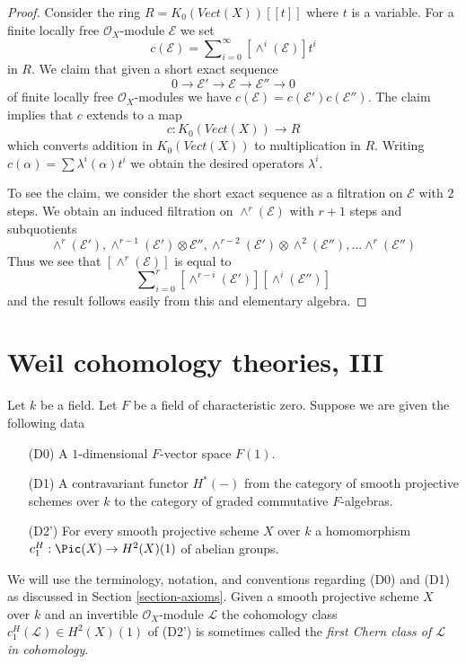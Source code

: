 \begin{proof}
Consider the ring $R = K_0(\textit{Vect}(X))[[t]]$ where $t$ is a
variable. For a finite locally free $\mathcal{O}_X$-module
$\mathcal{E}$ we set
$$
c(\mathcal{E}) = \sum\nolimits_{i = 0}^\infty [\wedge^i(\mathcal{E})] t^i
$$
in $R$. We claim that given a short exact sequence
$$
0 \to \mathcal{E}' \to \mathcal{E} \to \mathcal{E}'' \to 0
$$
of finite locally free $\mathcal{O}_X$-modules
we have $c(\mathcal{E}) = c(\mathcal{E}') c(\mathcal{E}'')$.
The claim implies that $c$ extends to a map
$$
c :  K_0(\textit{Vect}(X)) \longrightarrow R
$$
which converts addition in $K_0(\textit{Vect}(X))$ to multiplication in $R$.
Writing $c(\alpha) = \sum \lambda^i(\alpha) t^i$ we obtain the desired
operators $\lambda^i$.

\medskip\noindent
To see the claim, we consider the short exact sequence as a
filtration on $\mathcal{E}$ with $2$ steps. We obtain an induced
filtration on $\wedge^r(\mathcal{E})$ with $r + 1$ steps and
subquotients
$$
\wedge^r(\mathcal{E}'),
\wedge^{r - 1}(\mathcal{E}') \otimes \mathcal{E}'',
\wedge^{r - 2}(\mathcal{E}') \otimes \wedge^2(\mathcal{E}''), \ldots
\wedge^r(\mathcal{E}'')
$$
Thus we see that $[\wedge^r(\mathcal{E})]$ is equal to
$$
\sum\nolimits_{i = 0}^r
[\wedge^{r - i}(\mathcal{E}')] [\wedge^i(\mathcal{E}'')]
$$
and the result follows easily from this and elementary algebra.
\end{proof}










\section{Weil cohomology theories, III}
\label{section-c1}

\noindent
Let $k$ be a field. Let $F$ be a field of characteristic zero.
Suppose we are given the following data
\begin{enumerate}
\item[(D0)] A $1$-dimensional $F$-vector space $F(1)$.
\item[(D1)] A contravariant functor $H^*(-)$ from the category of smooth
projective schemes over $k$ to the category of graded commutative
$F$-algebras.
\item[(D2')] For every smooth projective scheme $X$ over $k$ a homomorphism
$c_1^H : \Pic(X) \to H^2(X)(1)$ of abelian groups.
\end{enumerate}
We will use the terminology, notation, and conventions regarding
(D0) and (D1) as discussed in Section \ref{section-axioms}.
Given a smooth projective scheme $X$ over $k$ and an invertible
$\mathcal{O}_X$-module $\mathcal{L}$ the cohomology class
$c_1^H(\mathcal{L}) \in H^2(X)(1)$ of (D2')
is sometimes called the {\it first Chern class of $\mathcal{L}$
in cohomology}.

